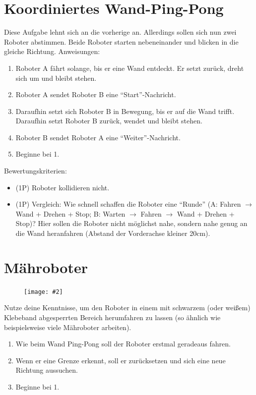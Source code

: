 \documentclass[
	12pt,
	colorbacktitle,
	accentcolor=tud1c,
	draft,
	twoside,
	german
]{tudexercise}
\newcommand{\easygcenter}[2]{
	\begin{figure}[h]
	\centering 
	\texttt{[image: \#2]}
	\end{figure}
}
\begin{document}
	\section{Koordiniertes Wand-Ping-Pong}
	Diese Aufgabe lehnt sich an die vorherige an. Allerdings sollen sich nun zwei Roboter abstimmen. Beide Roboter starten nebeneinander und blicken in die gleiche Richtung.
	Anweisungen:
	\begin{enumerate}
	\item Roboter A fährt solange, bis er eine Wand entdeckt. Er setzt zurück, dreht sich um und bleibt stehen.
	\item Roboter A sendet Roboter B eine “Start”-Nachricht.
	\item Daraufhin setzt sich Roboter B in Bewegung, bis er auf die Wand trifft. Daraufhin setzt Roboter B zurück, wendet und bleibt stehen.
	\item Roboter B sendet Roboter A eine “Weiter”-Nachricht.
	\item Beginne bei 1.
	\end{enumerate}
	
	Bewertungskriterien:
	
	\begin{itemize}
	\item (1P) Roboter kollidieren nicht.
	\item (1P) Vergleich: Wie schnell schaffen die Roboter eine “Runde” (A: Fahren $\rightarrow$ Wand + Drehen + Stop; B: Warten $\rightarrow$ Fahren $\rightarrow$ Wand + Drehen + Stop)? Hier sollen die Roboter nicht möglichst nahe, sondern nahe genug an die Wand heranfahren (Abstand der Vorderachse kleiner 20cm).
	\end{itemize}
	
	\newpage
	\section{Mähroboter}
	\easygcenter{.8\textwidth}{img/task_maehroboter.jpg}
	Nutze deine Kenntnisse, um den Roboter in einem mit schwarzem (oder weißem) Klebeband abgesperrten Bereich herumfahren zu lassen (so ähnlich wie beispielsweise viele Mähroboter arbeiten).
	\begin{enumerate}
	\item Wie beim Wand Ping-Pong soll der Roboter erstmal geradeaus fahren.
	\item Wenn er eine Grenze erkennt, soll er zurücksetzen und sich eine neue Richtung aussuchen.
	\item Beginne bei 1.
	\end{enumerate}
	
\end{document}
